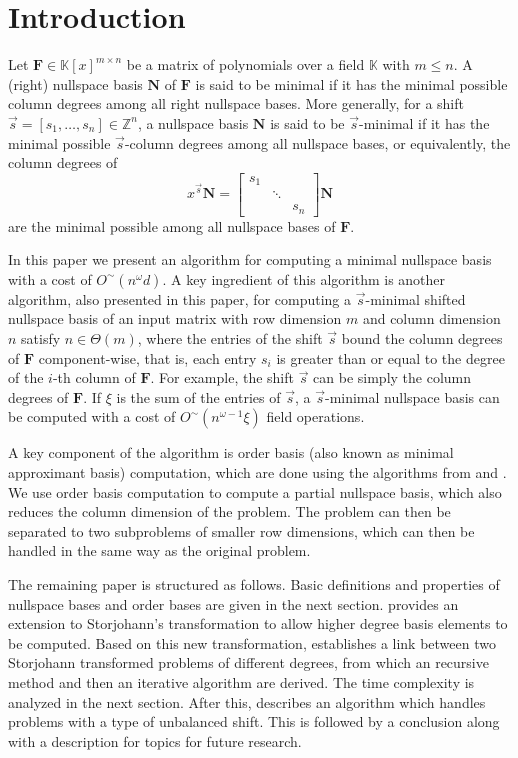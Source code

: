 
\section{Introduction}

Let $\mathbf{F}\in\mathbb{K}\left[x\right]^{m\times n}$ be a matrix
of polynomials over a field $\mathbb{K}$ with $m\le n$. A (right)
nullspace basis $\mathbf{N}$ of $\mathbf{F}$ is said to be minimal
if it has the minimal possible column degrees among all right nullspace
bases. More generally, for a shift $\vec{s}=[s_{1},\dots,s_{n}]\in\mathbb{Z}^{n}$,
a nullspace basis $\mathbf{N}$ is said to be $\vec{s}$-minimal if
it has the minimal possible $\vec{s}$-column degrees among all nullspace
bases, or equivalently, the column degrees of 
\[
x^{\vec{s}}\mathbf{N}=\begin{bmatrix}s_{1}\\
 & \ddots\\
 &  & s_{n}
\end{bmatrix}\mathbf{N}
\]
 are the minimal possible among all nullspace bases of $\mathbf{F}$.

In this paper we present an algorithm for computing a minimal nullspace
basis with a cost of $O^{\sim}\left(n^{\omega}d\right)$. A key ingredient
of this algorithm is another algorithm, also presented in this paper,
for computing a $\vec{s}$-minimal shifted nullspace basis of an input
matrix with row dimension $m$ and column dimension $n$ satisfy $n\in\Theta(m)$,
where the entries of the shift $\vec{s}$ bound the column degrees
of $\mathbf{F}$ component-wise, that is, each entry $s_{i}$ is greater
than or equal to the degree of the $i$-th column of $\mathbf{F}$.
For example, the shift $\vec{s}$ can be simply the column degrees
of $\mathbf{F}$. If $\xi$ is the sum of the entries of $\vec{s}$,
a $\vec{s}$-minimal nullspace basis can be computed with a cost of
$O^{\sim}(n^{\omega-1}\xi)$ field operations.

A key component of the algorithm is order basis (also known as minimal
approximant basis) computation, which are done using the algorithms
from \citet{Giorgi2003} and \citet{za2009}. We use order basis computation
to compute a partial nullspace basis, which also reduces the column
dimension of the problem. The problem can then be separated to two
subproblems of smaller row dimensions, which can then be handled in
the same way as the original problem. 

The remaining paper is structured as follows. Basic definitions and
properties of nullspace bases and order bases are given in the next
section.  provides an extension to Storjohann's
transformation to allow higher degree basis elements to be computed.
Based on this new transformation, 
establishes a link between two Storjohann transformed problems of
different degrees, from which an recursive method and then an iterative
algorithm are derived. The time complexity is analyzed in the next
section. After this,  describes an
algorithm which handles problems with a type of unbalanced shift.
This is followed by a conclusion along with a description for topics
for future research. 
